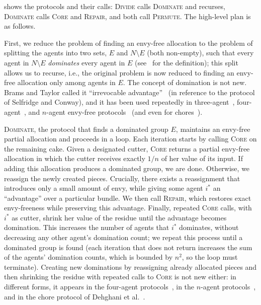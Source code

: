 \documentclass[11pt]{article}
\newcommand{\Core}{\textsc{Core}}
\newcommand{\Repair}{\textsc{Repair}}
\newcommand{\Dominate}{\textsc{Dominate}}
\newcommand{\Divide}{\textsc{Divide}}
\newcommand{\Permute}{\textsc{Permute}}
\theoremstyle{plain}
\theoremstyle{definition}
\theoremstyle{plain}
\begin{document}
 shows the protocols and their calls: \Divide{} calls \Dominate{} and recurses, \Dominate{} calls \Core{} and \Repair{}, and both call \Permute{}. The high-level plan is as follows. 




First, we reduce the problem of finding an envy-free allocation to the problem of splitting the agents into two sets, $E$ and $N \setminus E$ (both non-empty), such that every agent in $N \setminus E$ \emph{dominates} every agent in $E$ (see~ for the definition); this split allows us to recurse, i.e., the original problem is now reduced to finding an envy-free allocation only among agents in $E$. The concept of domination is not new. Brams and Taylor called it ``irrevocable advantage''~\cite{brams1995envy} (in reference to the protocol of Selfridge and
Conway), and it has been used repeatedly in three-agent~\cite{brams1995envy}, four-agent~\cite{aziz2016discretefour,amanatidis2018improved}, and $n$-agent envy-free protocols~\cite{aziz2016discrete,ye2026cutting} (and even for chores~\cite{dehghani2018envy}). 

\Dominate{}, the protocol that finds a dominated group $E$, maintains an envy-free partial allocation and proceeds in a loop. Each iteration starts by calling \Core{} on the remaining cake. Given a designated cutter, \Core{} returns a partial envy-free allocation in which the cutter receives exactly $1/n$ of her value of its input. If adding this allocation produces a dominated group, we are done. Otherwise, we reassign the newly created pieces. Crucially, there exists a reassignment that introduces only a small amount of envy, while giving some agent $i^*$ an ``advantage'' over a particular bundle. We then call \Repair{}, which restores exact envy-freeness while preserving this advantage. Finally, repeated \Core{} calls, with $i^*$ as cutter, shrink her value of the residue until the advantage becomes domination. This increases the number of agents that $i^*$ dominates, without decreasing any other agent's domination count; we repeat this process until a dominated group is found (each iteration that does not return increases the sum of the agents' domination counts, which is bounded by $n^2$, so the loop must terminate). Creating new dominations by reassigning already allocated pieces and then shrinking the residue with repeated calls to \Core{} is not new either: in different forms, it appears in the four-agent protocols~\cite{aziz2016discretefour,amanatidis2018improved}, in the $n$-agent protocols~\cite{aziz2016discrete,ye2026cutting}, and in the chore protocol of Dehghani et al.~\cite{dehghani2018envy}.
\end{document}
